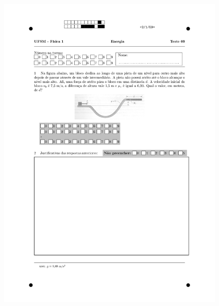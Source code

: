 \begin{figure}[H]\centering
\includegraphics[scale=0.7]{fig/orp1q8_page-0002.jpg}
\end{figure}
\vspace*{\fill}
